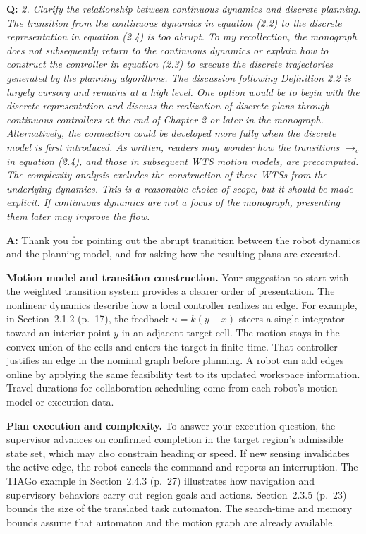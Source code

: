 \documentclass[11pt]{article}
\begin{document}
\begin{shaded*}
\noindent\textbf{Q:} \emph{2. Clarify the relationship between continuous
dynamics and discrete planning. The transition from the continuous dynamics in equation
(2.2) to the discrete representation in equation (2.4) is too abrupt. To my recollection,
the monograph does not subsequently return to the continuous dynamics or explain how to
construct the controller in equation (2.3) to execute the discrete trajectories generated
by the planning algorithms. The discussion following Definition 2.2 is largely cursory and
remains at a high level. One option would be to begin with the discrete representation and
discuss the realization of discrete plans through continuous controllers at the end of
Chapter 2 or later in the monograph. Alternatively, the connection could be developed more
fully when the discrete model is first introduced. As written, readers may wonder how the
transitions $\longrightarrow_c$ in equation (2.4), and those in subsequent WTS motion
models, are precomputed. The complexity analysis excludes the construction of these WTSs
from the underlying dynamics. This is a reasonable choice of scope, but it should be made
explicit. If continuous dynamics are not a focus of the monograph, presenting them later
may improve the flow.}
\end{shaded*}
\noindent\textbf{A:} Thank you for pointing out the abrupt transition between the
robot dynamics and the planning model, and for asking how the resulting plans are
executed.

\textbf{Motion model and transition construction.} Your suggestion to start with the
weighted transition system provides a clearer order of presentation. The nonlinear
dynamics describe how a local controller realizes an edge. For example, in
Section~2.1.2 (p.~17), the feedback $u=k(y-x)$ steers a single integrator toward
an interior point $y$ in an adjacent target cell. The motion stays in the convex union
of the cells
and enters the target in finite time. That controller justifies an edge in the nominal
graph before planning. A robot can add edges online by applying the same feasibility
test to its updated workspace information. Travel durations for collaboration scheduling
come from each robot's motion model or execution data.

\textbf{Plan execution and complexity.} To answer your execution question, the
supervisor advances on confirmed completion in the target region's admissible state
set, which may also constrain heading or speed. If new sensing invalidates the active
edge, the robot cancels the command and reports an interruption. The TIAGo example in
Section~2.4.3 (p.~27) illustrates how navigation and supervisory behaviors carry out
region goals and actions. Section~2.3.5 (p.~23) bounds the size of the translated task
automaton. The search-time and memory bounds assume that automaton and the motion graph
are already available.
\end{document}
